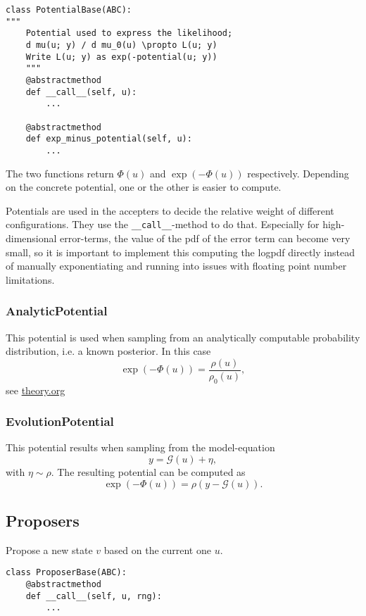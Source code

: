 \documentclass[11pt]{article}
\newcommand{\G}[1]{{\mathcal{G} \left( #1 \right)}}
\begin{document}
\begin{verbatim}
class PotentialBase(ABC):
"""
    Potential used to express the likelihood;
    d mu(u; y) / d mu_0(u) \propto L(u; y)
    Write L(u; y) as exp(-potential(u; y))
    """
    @abstractmethod
    def __call__(self, u):
        ...

    @abstractmethod
    def exp_minus_potential(self, u):
        ...
\end{verbatim}

The two functions return \(\Phi(u)\) and \(\exp(-\Phi(u))\) respectively. Depending on the
concrete potential, one or the other is easier to compute.

Potentials are used in the accepters to decide the relative weight of different configurations.
They use the \texttt{\_\_call\_\_}-method to do that. Especially for high-dimensional error-terms, the
value of the pdf of the error term can become very small, so it is important to implement this
computing the logpdf directly instead of manually exponentiating and running into issues with
floating point number limitations.

\subsubsection{AnalyticPotential}
\label{sec:orga91c4d9}

This potential is used when sampling from an analytically computable probability distribution,
i.e. a known posterior. In this case
$$\exp(-\Phi(u)) = \frac{\rho(u)}{\rho_0(u)},$$
see \url{theory.org}
\subsubsection{EvolutionPotential}
\label{sec:org172b629}

This potential results when sampling from the model-equation
$$y = \G{u} + \eta,$$
with \(\eta \sim \rho\). The resulting potential can be computed as
$$\exp(-\Phi(u)) = \rho(y - \G{u}).$$

\subsection{Proposers}
\label{sec:orge83ed87}

Propose a new state \(v\) based on the current one \(u\).

\begin{verbatim}
class ProposerBase(ABC):
    @abstractmethod
    def __call__(self, u, rng):
        ...
\end{verbatim}
\end{document}
